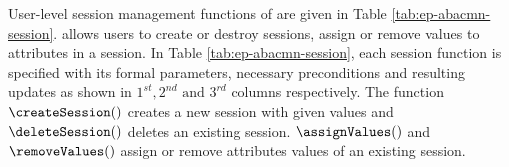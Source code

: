 
%
User-level session management functions of \EPMNModel{} are given in Table \ref{tab:ep-abacmn-session}. \EPMNModel{} allows users to create or destroy sessions, assign or remove values to attributes in a session.  In Table \ref{tab:ep-abacmn-session}, each session function is specified with its formal parameters, necessary preconditions and resulting updates as shown in $1^{st}, 2^{nd} \text{ and }  3^{rd}$ columns respectively. The function $\createSession()$ creates a new session with given values and $\deleteSession()$ deletes an existing session.  $\assignValues()$ and $\removeValues()$  assign or remove attributes values of an existing session.




